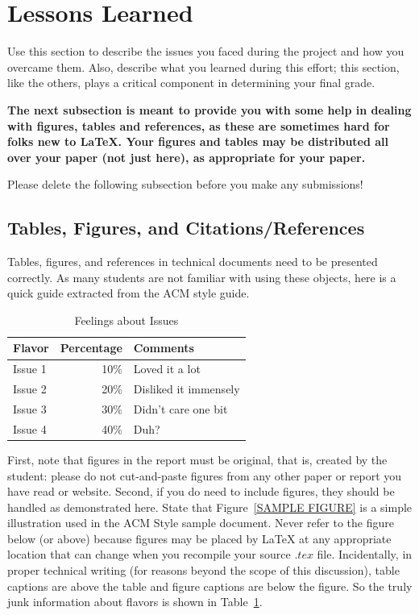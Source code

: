\documentclass[12pt]{article}
\begin{document}
\section{Lessons Learned}
Use this section to describe the issues you faced during the project and how you overcame them. Also, describe what you learned during this effort; this section, like the others, plays a critical component in determining your final grade.\\

{\bf The next subsection is meant to provide you with some help in
  dealing with figures, tables and references, as these are sometimes
  hard for folks new to \LaTeX. Your figures and tables
  may be distributed all over your paper (not just here), as appropriate for your paper.

  Please delete the following subsection before you make any submissions!}

\subsection{Tables, Figures, and Citations/References}

Tables, figures, and references in technical
documents need to be presented correctly. As many students
are not familiar with using these objects, here is a quick
guide extracted from the ACM style guide.

\begin{table}
\centering
\caption{Feelings about Issues}
\label{SAMPLE TABLE}
\begin{tabular}{|l|r|l|} \hline
Flavor&Percentage&Comments\\ \hline
Issue 1 &  10\% & Loved it a lot\\ \hline
Issue 2 &  20\% & Disliked it immensely\\ \hline
Issue 3 &  30\% & Didn't care one bit\\ \hline
Issue 4 &  40\% & Duh?\\ \hline
\end{tabular}
\end{table}


First, note that figures in the report must be original, that is,
created by the student: please do not cut-and-paste figures from any
other paper or report you have read or website. Second, if you do need to include figures,
they should be handled as demonstrated here. State that
Figure~\ref{SAMPLE FIGURE} is a simple illustration used in the ACM
Style sample document. Never refer to the figure below (or above)
because figures may be placed by \LaTeX{} at any appropriate location
that can change when you recompile your source $.tex$
file. Incidentally, in proper technical writing (for reasons beyond
the scope of this discussion), table captions are above the table and
figure captions are below the figure. So the truly junk information
about flavors is shown in Table~\ref{SAMPLE TABLE}.
\end{document}
